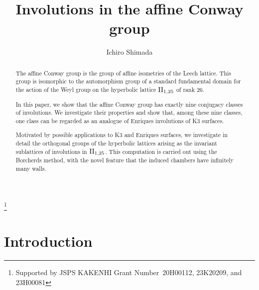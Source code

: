 \documentclass{amsart} %
\begin{document}
\title[Involutions in the affine Conway group]
{Involutions in the affine Conway group}

\author{Ichiro Shimada}
\address{Department of Mathematics,
Graduate School of Science,
Hiroshima University,
1-3-1 Kagamiyama,
Higashi-Hiroshima,
739-8526 JAPAN}
\thanks{Supported by JSPS KAKENHI Grant Number~20H00112, 23K20209, and 23H00081}



\begin{abstract}
The affine Conway group is the group of affine isometries of the Leech lattice.
This group is isomorphic to the automorphism group of 
a standard fundamental domain for the action of 
the Weyl group on the hyperbolic lattice $\mathrm{II}_{1, 25}$ of rank $26$.
 \par
In this paper, we show that the affine Conway group has exactly nine conjugacy classes of involutions.
We investigate their properties
and show that, 
among these nine classes, 
one class can be regarded as an analogue of Enriques involutions of K3 surfaces.
 \par
Motivated by possible applications to K3 and Enriques surfaces, 
we investigate in detail the orthogonal groups of the hyperbolic lattices arising as the invariant sublattices of involutions in $\mathrm{II}_{1, 25}$.
This computation is carried out using the Borcherds method, 
with the novel feature that the induced chambers have infinitely many walls.
\end{abstract}
%
\keywords{}
\maketitle
%
%
% 
\section{Introduction}
%
\end{document}
